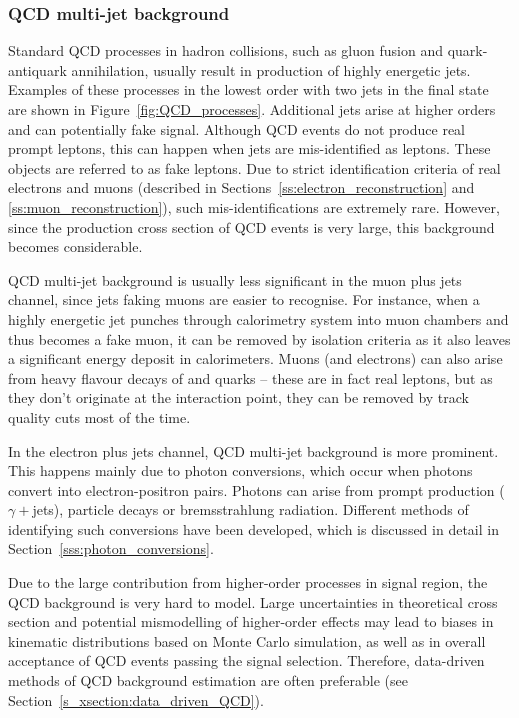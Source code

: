 \subsubsection*{QCD multi-jet background}
Standard QCD processes in hadron collisions, such as gluon fusion and quark-antiquark annihilation, usually result in
production of highly energetic jets. Examples of these processes in the lowest order with two jets in the final state
are shown in Figure~\ref{fig:QCD_processes}. Additional jets arise at higher orders and can potentially fake \ttbar
signal. Although QCD events do not produce real prompt leptons, this can happen when jets are mis-identified as leptons.
These objects are referred to as fake leptons. Due to strict identification criteria of real electrons and muons
(described in Sections~\ref{ss:electron_reconstruction} and \ref{ss:muon_reconstruction}), such mis-identifications are
extremely rare. However, since the production cross section of QCD events is very large, this background becomes
considerable.



QCD multi-jet background is usually less significant in the muon plus jets channel, since jets faking muons are easier
to recognise. For instance, when a highly energetic jet punches through calorimetry system into muon chambers and thus
becomes a fake muon, it can be removed by isolation criteria as it also leaves a significant energy deposit in
calorimeters. Muons (and electrons) can also arise from heavy flavour decays of \cPqb and \cPqc quarks -- these are in
fact real leptons, but as they don't originate at the interaction point, they can be removed by track quality cuts most
of the time.

In the electron plus jets channel, QCD multi-jet background is more prominent. This happens mainly due to photon
conversions, which occur when photons convert into electron-positron pairs. Photons can arise from prompt production
($\gamma+$jets), particle decays or bremsstrahlung radiation. Different methods of identifying such conversions have
been developed, which is discussed in detail in Section~\ref{sss:photon_conversions}.

Due to the large contribution from higher-order processes in signal region, the QCD background is very hard to model.
Large uncertainties in theoretical cross section and potential mismodelling of higher-order effects may lead to biases
in kinematic distributions based on Monte Carlo simulation, as well as in overall acceptance of QCD events passing the
signal selection. Therefore, data-driven methods of QCD background estimation are often preferable (see
Section~\ref{s_xsection:data_driven_QCD}).

